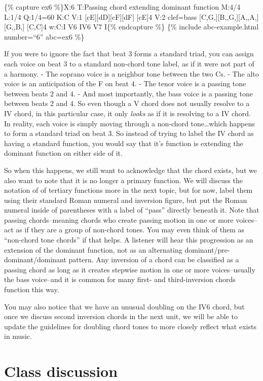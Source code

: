 \documentclass{book}
\begin{document}
\{\% capture ex6 \%\}X:6 T:Passing chord extending dominant function M:4/4
L:1/4 Q:1/4=60 K:C V:1 {[}cE{]}{[}dD{]}{[}cF{]}{[}dF{]}\textbar{}
{[}cE{]}4\textbar{]} V:2 clef=bass
{[}C,G,{]}{[}B,,G,{]}{[}A,,A,{]}{[}G,,B,{]}\textbar{} {[}C,C{]}4\textbar{]}
w:C:I V6 IV6 V7 I\{\% endcapture \%\} \{\% include abc-example.html
number=``6'' abc=ex6 \%\}

If you were to ignore the fact that beat 3 forms a standard triad, you can
assign each voice on beat 3 to a standard non-chord tone label, as if it were
not part of a harmony. - The soprano voice is a neighbor tone between the two
Cs. - The alto voice is an anticipation of the F on beat 4. - The tenor voice
is a passing tone between beats 2 and 4. - And most importantly, the bass
voice is a passing tone between beats 2 and 4. So even though a V chord does
not usually resolve to a IV chord, in this particular case, it only
\emph{looks} as if it is resolving to a IV chord. In reality, each voice is
simply moving through a non-chord tone\ldots which happens to form a standard
triad on beat 3. So instead of trying to label the IV chord as having a
standard function, you would say that it's function is extending the dominant
function on either side of it.

So when this happens, we still want to acknowledge that the chord exists, but
we also want to note that it is no longer a primary function. We will discuss
the notation of of tertiary functions more in the next topic, but for now,
label them using their standard Roman numeral and inversion figure, but put
the Roman numeral inside of parentheses with a label of ``pass'' directly
beneath it. Note that passing chords--meaning chords who create passing motion
in one or more voices--act as if they are a group of non-chord tones. You may
even think of them as ``non-chord tone chords'' if that helps. A listener will
hear this progression as an extension of the dominant function, not as an
alternating dominant/pre-dominant/dominant pattern. Any inversion of a chord
can be classified as a passing chord as long as it creates stepwise motion in
one or more voices--usually the bass voice--and it is common for many first-
and third-inversion chords function this way.

You may also notice that we have an unusual doubling on the IV6 chord, but
once we discuss second inversion chords in the next unit, we will be able to
update the guidelines for doubling chord tones to more closely reflect what
exists in music.

\hypertarget{class-discussion-46}{%
\chapter{Class discussion}\label{class-discussion-46}}
\end{document}
